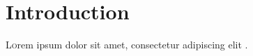 \section{Introduction}
\lettrine[nindent=0em,lines=3]{L} orem ipsum dolor sit amet, consectetur adipiscing elit \cite{GCN-for-webscale-Recommender}.
